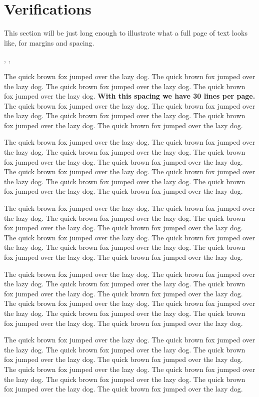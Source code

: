 \documentclass{article}
\begin{document}
\section{Verifications}
\label{sec:verify}
This section will be just long enough to illustrate what a full page of
text looks like, for margins and spacing.


\cite{Campbell02}, \cite{Schubert13}, \cite{Chi81}


The quick brown fox jumped over the lazy dog.
The quick brown fox jumped over the lazy dog.
The quick brown fox jumped over the lazy dog.
The quick brown fox jumped over the lazy dog.
{\bf With this spacing we have 30 lines per page.}
The quick brown fox jumped over the lazy dog.
The quick brown fox jumped over the lazy dog.
The quick brown fox jumped over the lazy dog.
The quick brown fox jumped over the lazy dog.
The quick brown fox jumped over the lazy dog.

The quick brown fox jumped over the lazy dog.
The quick brown fox jumped over the lazy dog.
The quick brown fox jumped over the lazy dog.
The quick brown fox jumped over the lazy dog.
The quick brown fox jumped over the lazy dog.
The quick brown fox jumped over the lazy dog.
The quick brown fox jumped over the lazy dog.
The quick brown fox jumped over the lazy dog.
The quick brown fox jumped over the lazy dog.
The quick brown fox jumped over the lazy dog.

The quick brown fox jumped over the lazy dog.
The quick brown fox jumped over the lazy dog.
The quick brown fox jumped over the lazy dog.
The quick brown fox jumped over the lazy dog.
The quick brown fox jumped over the lazy dog.
The quick brown fox jumped over the lazy dog.
The quick brown fox jumped over the lazy dog.
The quick brown fox jumped over the lazy dog.
The quick brown fox jumped over the lazy dog.
The quick brown fox jumped over the lazy dog.

The quick brown fox jumped over the lazy dog.
The quick brown fox jumped over the lazy dog.
The quick brown fox jumped over the lazy dog.
The quick brown fox jumped over the lazy dog.
The quick brown fox jumped over the lazy dog.
The quick brown fox jumped over the lazy dog.
The quick brown fox jumped over the lazy dog.
The quick brown fox jumped over the lazy dog.
The quick brown fox jumped over the lazy dog.
The quick brown fox jumped over the lazy dog.

The quick brown fox jumped over the lazy dog.
The quick brown fox jumped over the lazy dog.
The quick brown fox jumped over the lazy dog.
The quick brown fox jumped over the lazy dog.
The quick brown fox jumped over the lazy dog.
The quick brown fox jumped over the lazy dog.
The quick brown fox jumped over the lazy dog.
The quick brown fox jumped over the lazy dog.
The quick brown fox jumped over the lazy dog.
The quick brown fox jumped over the lazy dog.
\end{document}
